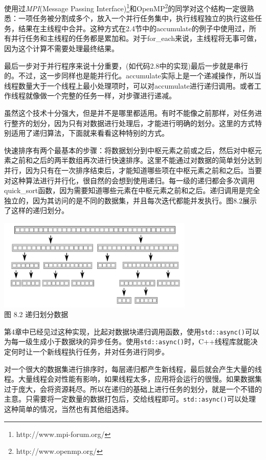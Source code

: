 使用过\textit{MPI}(Message Passing Interface)\footnote[1]{http://www.mpi-forum.org/}和OpenMP\footnote[2]{http://www.openmp.org/}的同学对这个结构一定很熟悉：一项任务被分割成多个，放入一个并行任务集中，执行线程独立的执行这些任务，结果在主线程中合并。这种方式在2.4节中的accumulate的例子中使用过，所有并行任务和主线程的任务都是累加和。对于for\_each来说，主线程将无事可做，因为这个计算不需要处理最终结果。

最后一步对于并行程序来说十分重要，(如代码2.8中的实现)最后一步就是串行的。不过，这一步同样也是能并行化。accumulate实际上是一个递减操作，所以当线程数量大于一个线程上最小处理项时，可以对accumulate进行递归调用。或者工作线程就像做一个完整的任务一样，对步骤进行递减。

虽然这个技术十分强大，但是并不是哪里都适用。有时不能像之前那样，对任务进行整齐的划分，因为只有对数据进行处理后，才能进行明确的划分。这里的方式特别适用了递归算法，下面就来看看这种特别的方式。


快速排序有两个最基本的步骤：将数据划分到中枢元素之前或之后，然后对中枢元素之前和之后的两半数组再次进行快速排序。这里不能通过对数据的简单划分达到并行，因为只有在一次排序结束后，才能知道哪些项在中枢元素之前和之后。当要对这种算法进行并行化，很自然的会想到使用递归。每一级的递归都会多次调用quick\_sort函数，因为需要知道哪些元素在中枢元素之前和之后。递归调用是完全独立的，因为其访问的是不同的数据集，并且每次迭代都能并发执行。图8.2展示了这样的递归划分。

\begin{center}
  \includegraphics[width=0.7\textwidth]{content/chapter08/images/8-2.png}\\
  图 8.2 递归划分数据
\end{center}

第4章中已经见过这种实现，比起对数据块递归调用函数，使用\texttt{std::async()}可以为每一级生成小于数据块的异步任务。使用\texttt{std::async()}时，C++线程库就能决定何时让一个新线程执行任务，并对任务进行同步。

对一个很大的数据集进行排序时，每层递归都产生新线程，最后就会产生大量的线程。大量线程会对性能有影响，如果线程太多，应用将会运行的很慢。如果数据集过于庞大，会将资源耗尽。所以在递归的基础上进行任务的划分，就是一个不错的主意。只需要将一定数量的数据打包后，交给线程即可。\texttt{std::async()}可以处理这种简单的情况，当然也有其他组选择。

